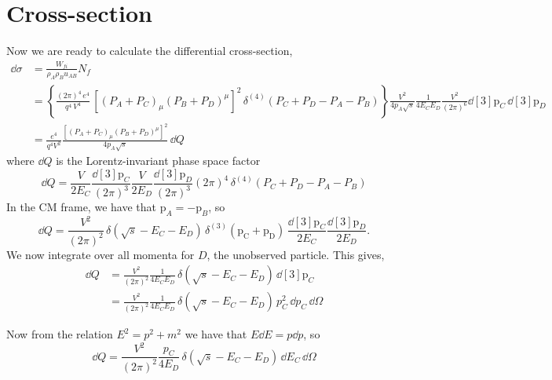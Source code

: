 \documentclass{report}
\renewcommand{\vec}[1]{\bm{\mathrm{#1}}}
\begin{document}
\section{Cross-section}
Now we are ready to calculate the differential cross-section,
\begin{align}
\dd{\sigma} &= \frac{W_{fi}}{\rho_A\rho_Bu_{AB}} N_f \\
&= \left\{ \frac{(2\pi)^4\,e^4}{q^4 \, V^4} \, \left[ (P_A + P_C)_\mu (P_B + P_D)^\mu \right]^2\, \delta^{(4)}(P_C+P_D-P_A-P_B) \right\} \frac{V^2}{4p_A\sqrt{s}} \frac{1}{4E_CE_D}\frac{V^2}{(2\pi)^6} \dd[3]{\vec{p}_C} \, \dd[3]{\vec{p}_D} \nonumber \\
&= \frac{e^4}{q^4V^2} \frac{\left[ (P_A + P_C)_\mu (P_B + P_D)^\mu \right]^2}{4p_A\sqrt{s}} \, \dd{Q}
\end{align}
where $\dd{Q}$ is the Lorentz-invariant phase space factor
\begin{equation}
\dd{Q} = \frac{V}{2E_C} \frac{\dd[3]{\vec{p}_C}}{(2\pi)^3} \frac{V}{2E_D} \frac{\dd[3]{\vec{p}_D}}{(2\pi)^3} (2\pi)^4 \, \delta^{(4)}(P_C+P_D-P_A-P_B)
\end{equation}
In the CM frame, we have that $\vec{p}_A = -\vec{p}_B$, so
\begin{equation}
\dd{Q} = \frac{V^2}{(2\pi)^2} \, \delta(\sqrt{s} - E_C - E_D) \, \delta^{(3)}(\vec{p_C} + \vec{p_D}) \, \frac{\dd[3]{\vec{p}_C}}{2E_C} \frac{\dd[3]{\vec{p}_D}}{2E_D}.
\end{equation}
We now integrate over all momenta for $D$, the unobserved particle. This gives,
\begin{align}
\dd{Q} &= \frac{V^2}{(2\pi)^2} \frac{1}{4E_C E_D} \, \delta(\sqrt{s} - E_C - E_D) \, \dd[3]{\vec{p}_C} \\
&= \frac{V^2}{(2\pi)^2} \frac{1}{4E_C E_D} \, \delta(\sqrt{s} - E_C - E_D) \, p_C^2 \, \dd{p_C} \, \dd{\Omega}
\end{align}

Now from the relation $E^2 = p^2 + m^2$ we have that $E \dd{E} = p\dd{p}$, so
\begin{equation}
\dd{Q} = \frac{V^2}{(2\pi)^2} \frac{p_C}{4 E_D} \, \delta(\sqrt{s} - E_C - E_D)  \, \dd{E_C} \, \dd{\Omega}
\end{equation}
\end{document}
